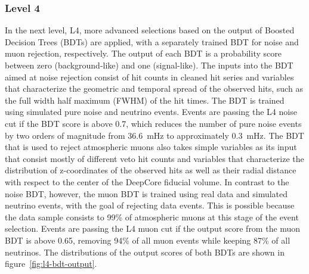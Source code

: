 \subsubsection{Level 4}
In the next level, L4, more advanced selections based on the output of Boosted Decision Trees (BDTs) are applied, with a separately trained BDT for noise and muon rejection, respectively. The output of each BDT is a probability score between zero (background-like) and one (signal-like).  The inputs into the BDT aimed at noise rejection consist of hit counts in cleaned hit series and variables that characterize the geometric and temporal spread of the observed hits, such as the full width half maximum (FWHM) of the hit times. The BDT is trained using simulated pure noise and neutrino events. Events are passing the L4 noise cut if the BDT score is above 0.7, which reduces the number of pure noise events by two orders of magnitude from 36.6~mHz to approximately 0.3~mHz. The BDT that is used to reject atmospheric muons also takes simple variables as its input that consist mostly of different veto hit counts and variables that characterize the distribution of z-coordinates of the observed hits as well as their radial distance with respect to the center of the DeepCore fiducial volume. In contrast to the noise BDT, however, the muon BDT is trained using real data and simulated neutrino events, with the goal of rejecting data events. This is possible because the data sample consists to 99\% of atmospheric muons at this stage of the event selection. Events are passing the L4 muon cut if the output score from the muon BDT is above 0.65, removing 94\% of all muon events while keeping 87\% of all neutrinos. The distributions of the output scores of both BDTs are shown in figure~\ref{fig:l4-bdt-output}.
